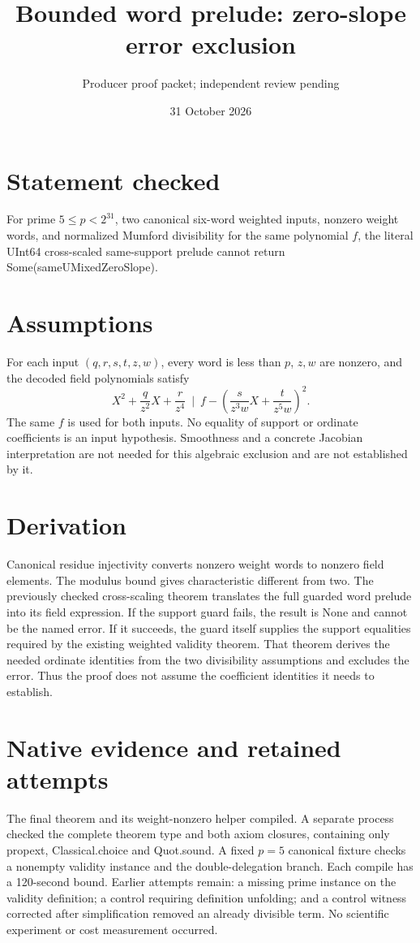 \documentclass[10pt]{article}
\begin{document}
\title{Bounded word prelude: zero-slope error exclusion}
\author{Producer proof packet; independent review pending}
\date{31 October 2026}\maketitle
\section*{Statement checked}
For prime $5\le p<2^{31}$, two canonical six-word weighted inputs, nonzero weight words, and normalized Mumford divisibility for the same polynomial $f$, the literal UInt64 cross-scaled same-support prelude cannot return Some(sameUMixedZeroSlope).
\section*{Assumptions}
For each input $(q,r,s,t,z,w)$, every word is less than $p$, $z,w$ are nonzero, and the decoded field polynomials satisfy
\[
X^2+\frac q{z^2}X+\frac r{z^4}\ \mid\ f-\left(\frac s{z^3w}X+\frac t{z^5w}\right)^2.
\]
The same $f$ is used for both inputs. No equality of support or ordinate coefficients is an input hypothesis. Smoothness and a concrete Jacobian interpretation are not needed for this algebraic exclusion and are not established by it.
\section*{Derivation}
Canonical residue injectivity converts nonzero weight words to nonzero field elements. The modulus bound gives characteristic different from two. The previously checked cross-scaling theorem translates the full guarded word prelude into its field expression. If the support guard fails, the result is None and cannot be the named error. If it succeeds, the guard itself supplies the support equalities required by the existing weighted validity theorem. That theorem derives the needed ordinate identities from the two divisibility assumptions and excludes the error. Thus the proof does not assume the coefficient identities it needs to establish.
\section*{Native evidence and retained attempts}
The final theorem and its weight-nonzero helper compiled. A separate process checked the complete theorem type and both axiom closures, containing only propext, Classical.choice and Quot.sound. A fixed $p=5$ canonical fixture checks a nonempty validity instance and the double-delegation branch. Each compile has a 120-second bound. Earlier attempts remain: a missing prime instance on the validity definition; a control requiring definition unfolding; and a control witness corrected after simplification removed an already divisible term. No scientific experiment or cost measurement occurred.
\end{document}
